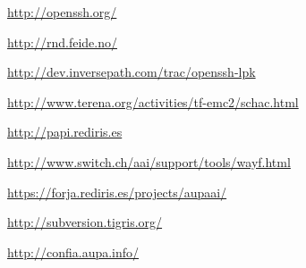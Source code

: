 \newpage


\begin{thebibliography}{widest-label}

  \url{http://openssh.org/}

  \url{http://rnd.feide.no/}
 
  \url{http://dev.inversepath.com/trac/openssh-lpk}

  \url{http://www.terena.org/activities/tf-emc2/schac.html}
 
  \url{http://papi.rediris.es}

  \url{http://www.switch.ch/aai/support/tools/wayf.html}

  \url{https://forja.rediris.es/projects/aupaai/}

  \url{http://subversion.tigris.org/}

  \url{http://confia.aupa.info/}

\end{thebibliography}



